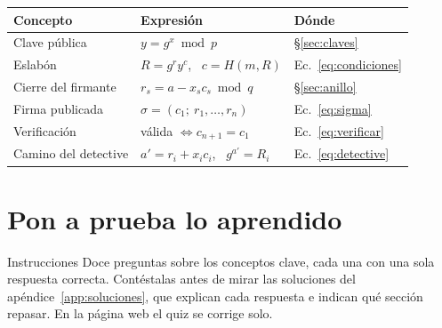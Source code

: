 \documentclass[11pt,a4paper]{article}
\theoremstyle{definition}
\theoremstyle{plain}
\theoremstyle{remark}
\begin{document}
\begin{center}\small
\captionsetup{type=table}
\caption{Todo el módulo en seis renglones.}
\label{tab:resumen}
\begin{tabular}{@{}l l l@{}}
\toprule
\textbf{Concepto} & \textbf{Expresión} & \textbf{Dónde} \\
\midrule
Clave pública & $y = g^{x} \bmod p$ & §\ref{sec:claves} \\
Eslabón & $R = g^{r} y^{c}$, \ $c = H(m,R)$ & Ec.~\eqref{eq:condiciones} \\
Cierre del firmante & $r_s = a - x_s c_s \bmod q$ & §\ref{sec:anillo} \\
Firma publicada & $\sigma = (c_1;\ r_1,\dots,r_n)$ & Ec.~\eqref{eq:sigma} \\
Verificación & válida $\iff c_{n+1} = c_1$ & Ec.~\eqref{eq:verificar} \\
Camino del detective & $a' = r_i + x_i c_i$, \ $g^{a'} = R_i$ & Ec.~\eqref{eq:detective} \\
\bottomrule
\end{tabular}
\end{center}

\section{Pon a prueba lo aprendido}\label{sec:quiz}

\begin{nota}{Instrucciones}
Doce preguntas sobre los conceptos clave, cada una con una sola respuesta correcta.
Contéstalas antes de mirar las soluciones del apéndice~\ref{app:soluciones}, que
explican cada respuesta e indican qué sección repasar. En la página web el quiz se
corrige solo.
\end{nota}
\end{document}
